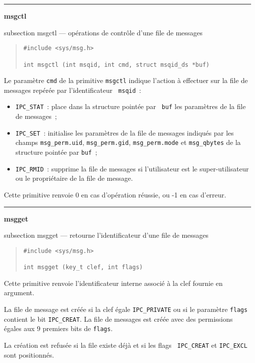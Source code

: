 \documentclass [twoside] {report}
\newcommand {\primitive} [1]
    {
	\phantomsection
	{\large \bf #1}
	\addcontentsline {toc} {subsection} {#1}
    }
\newcommand {\separation}
    {
	\vspace {5mm}
	\nopagebreak
	\hrule
    }
\begin{document}
\separation
\primitive {msgctl} --- opérations de contrôle d'une file de messages

\begin {quote}
\begin {verbatim}
#include <sys/msg.h>

int msgctl (int msqid, int cmd, struct msqid_ds *buf)
\end{verbatim}
\end {quote}

Le paramètre {\tt cmd} de la primitive {\tt msgctl} indique l'action à
effectuer sur la file de messages repérée par l'identificateur {\tt
msqid}~:

\begin {itemize}
    \item {\tt IPC\_STAT}~: place dans la structure pointée par {\tt
	buf} les paramètres de la file de messages~;
    \item {\tt IPC\_SET}~: initialise les paramètres de la file de
	messages indiqués par les champs {\tt msg\_perm.uid},
	{\tt msg\_perm.gid}, {\tt msg\_perm.mode} et {\tt msg\_qbytes}
	de la structure pointée par {\tt buf}~;
    \item {\tt IPC\_RMID}~: supprime la file de messages si
	l'utilisateur est le super-utilisateur ou le propriétaire de
	la file de message.
\end {itemize}

Cette primitive renvoie 0 en cas d'opération
réussie, ou -1 en cas d'erreur.


\separation
\primitive {msgget} --- retourne l'identificateur d'une file de messages

\begin {quote}
\begin {verbatim}
#include <sys/msg.h>

int msgget (key_t clef, int flags)
\end{verbatim}
\end {quote}

Cette primitive renvoie l'identificateur interne associé à la clef
fournie en argument.

La file de message est créée si la clef égale {\tt IPC\_PRIVATE} ou si
le paramètre {\tt flags} contient le bit {\tt IPC\_CREAT}.  La file de
messages est créée avec des permissions égales aux 9 premiers bits de
{\tt flags}.

La création est refusée si la file existe déjà et si les flags {\tt
IPC\_CREAT} et {\tt IPC\_EXCL} sont positionnés.
\end{document}
